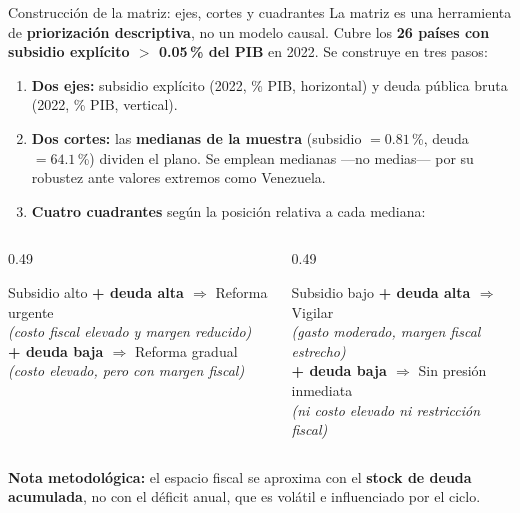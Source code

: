 \documentclass[aspectratio=169,10pt]{beamer}
\newcommand{\key}[1]{{\bfseries\color{AcentoRojo}#1}}
\begin{document}
\begin{frame}{Construcción de la matriz: ejes, cortes y cuadrantes}
  \small
  La matriz es una herramienta de \textbf{priorización descriptiva}, no un modelo causal. Cubre los
  \textbf{26 países con subsidio explícito $>$ 0.05\,\% del PIB} en 2022. Se construye en tres pasos:
  \begin{enumerate}
    \item \textbf{Dos ejes:} subsidio explícito (2022, \% PIB, horizontal) y deuda pública
          bruta (2022, \% PIB, vertical).
    \item \textbf{Dos cortes:} las \key{medianas de la muestra} (subsidio $= 0.81$\,\%,
          deuda $= 64.1$\,\%) dividen el plano. Se emplean medianas —no medias— por su
          robustez ante valores extremos como Venezuela.
    \item \textbf{Cuatro cuadrantes} según la posición relativa a cada mediana:
  \end{enumerate}
  \vspace{-0.2em}
  \begin{columns}[T]
    \begin{column}{0.49\textwidth}
      \begin{block}{Subsidio alto}
        \footnotesize
        \textbf{+ deuda alta $\Rightarrow$} \alert{Reforma urgente}\\
        \emph{(costo fiscal elevado y margen reducido)}\\[0.3em]
        \textbf{+ deuda baja $\Rightarrow$} \alert{Reforma gradual}\\
        \emph{(costo elevado, pero con margen fiscal)}
      \end{block}
    \end{column}
    \begin{column}{0.49\textwidth}
      \begin{block}{Subsidio bajo}
        \footnotesize
        \textbf{+ deuda alta $\Rightarrow$} \alert{Vigilar}\\
        \emph{(gasto moderado, margen fiscal estrecho)}\\[0.3em]
        \textbf{+ deuda baja $\Rightarrow$} \alert{Sin presión inmediata}\\
        \emph{(ni costo elevado ni restricción fiscal)}
      \end{block}
    \end{column}
  \end{columns}
  \vspace{0.1em}
  {\footnotesize \textbf{Nota metodológica:} el espacio fiscal se aproxima con el
  \textbf{stock de deuda acumulada}, no con el déficit anual, que es volátil e influenciado
  por el ciclo.}


\end{frame}
\end{document}
